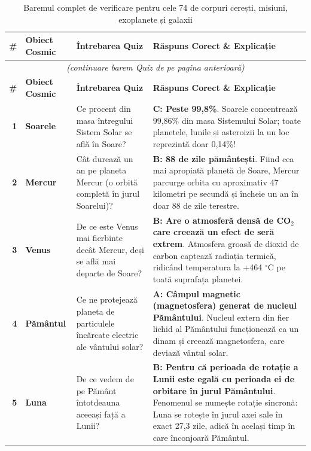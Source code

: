 \begingroup
\small
\begin{longtable}{@{}r >{\raggedright\arraybackslash}p{2.7cm} >{\raggedright\arraybackslash}p{4.8cm} >{\raggedright\arraybackslash}p{6.5cm}@{}}
\caption{Baremul complet de verificare pentru cele 74 de corpuri cerești, misiuni, exoplanete și galaxii} \\
\toprule
\textbf{\#} & \textbf{Obiect Cosmic} & \textbf{Întrebarea Quiz} & \textbf{Răspuns Corect \& Explicație} \\
\midrule
\endfirsthead
\multicolumn{4}{c}{{\footnotesize\itshape (continuare barem Quiz de pe pagina anterioară)}} \\
\toprule
\textbf{\#} & \textbf{Obiect Cosmic} & \textbf{Întrebarea Quiz} & \textbf{Răspuns Corect \& Explicație} \\
\midrule
\endhead
\bottomrule
\endfoot
\textbf{1} & \textbf{Soarele} & Ce procent din masa întregului Sistem Solar se află în Soare? & \textbf{C: Peste 99,8\%}. {\footnotesize Soarele concentrează 99,86\% din masa Sistemului Solar; toate planetele, lunile și asteroizii la un loc reprezintă doar 0,14\%!} \\ \midrule
\textbf{2} & \textbf{Mercur} & Cât durează un an pe planeta Mercur (o orbită completă în jurul Soarelui)? & \textbf{B: 88 de zile pământești}. {\footnotesize Fiind cea mai apropiată planetă de Soare, Mercur parcurge orbita cu aproximativ 47 kilometri pe secundă și încheie un an în doar 88 de zile terestre.} \\ \midrule
\textbf{3} & \textbf{Venus} & De ce este Venus mai fierbinte decât Mercur, deși se află mai departe de Soare? & \textbf{B: Are o atmosferă densă de CO$_2$ care creează un efect de seră extrem}. {\footnotesize Atmosfera groasă de dioxid de carbon captează radiația termică, ridicând temperatura la +464 $^\circ$C pe toată suprafața planetei.} \\ \midrule
\textbf{4} & \textbf{Pământul} & Ce ne protejează planeta de particulele încărcate electric ale vântului solar? & \textbf{A: Câmpul magnetic (magnetosfera) generat de nucleul Pământului}. {\footnotesize Nucleul extern din fier lichid al Pământului funcționează ca un dinam și creează magnetosfera, care deviază vântul solar.} \\ \midrule
\textbf{5} & \textbf{Luna} & De ce vedem de pe Pământ întotdeauna aceeași față a Lunii? & \textbf{B: Pentru că perioada de rotație a Lunii este egală cu perioada ei de orbitare în jurul Pământului}. {\footnotesize Fenomenul se numește rotație sincronă: Luna se rotește în jurul axei sale în exact 27,3 zile, adică în același timp în care înconjoară Pământul.} \\ \midrule

\end{longtable}
